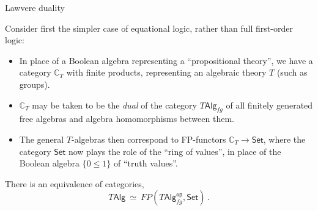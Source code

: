 \documentclass{beamer}
\newcommand{\Set}{\mathsf{Set}}
\begin{document}
\begin{frame}{Lawvere duality}

Consider first the simpler case of equational logic, rather than full first-order logic:
\begin{itemize}

\item In place of a Boolean algebra representing a ``propositional theory'', we have a category $\mathbb{C}_T$ with finite products, representing an algebraic theory $T$ (such as groups). 

\item $\mathbb{C}_T$ may be taken to be the \emph{dual}  of the category $T\mathsf{Alg}_{fg}$ of all finitely generated free algebras and algebra homomorphisms between them.


\item The general $T$-algebras then correspond to FP-functors $\mathbb{C}_T \to \Set$, where the category $\Set$ now plays the role of the ``ring of values'', in place of the Boolean algebra $\{ 0 \leq 1\}$ of ``truth values''. 
\end{itemize}


\begin{theorem}[Lawvere 1963]
There is an equivalence of categories,
\[
T\mathsf{Alg}\ \simeq\ FP(T\mathsf{Alg}_{fg}^\mathsf{op}, \Set)\,.
\]
\end{theorem}

\end{frame}
\end{document}
